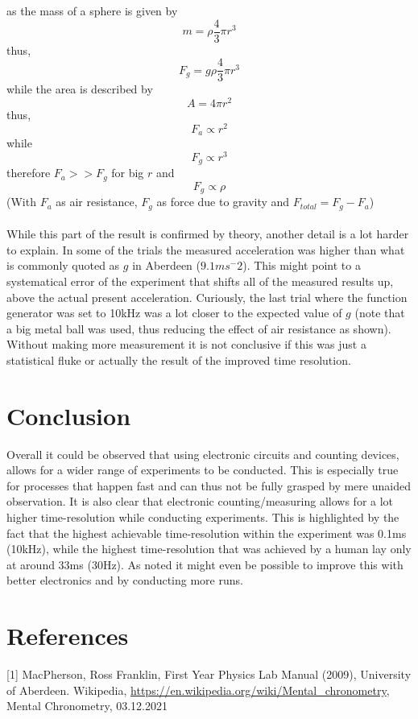 \documentclass[fleqn,14pt]{article}
\begin{document}
as the mass of a sphere is given by
$$
m = \rho \frac{4}{3} \pi r^3
$$
thus,
$$
F_g = g \rho \frac{4}{3} \pi r^3
$$
while the area is described by
$$
A =  4 \pi r^2
$$
thus,
$$
F_a \propto r^2
$$
while
$$
F_g \propto r^3
$$
therefore $F_a >> F_g$ for big $r$
and
$$
F_g \propto \rho
$$
(With $F_a$ as air resistance, $F_g$ as force due to gravity and
$F_{total} = F_g - F_a$)\\
\\
While this part of the result is confirmed by theory, another detail is a lot harder to explain. In some
of the trials the measured acceleration was higher than what is commonly quoted as $g$ in Aberdeen ($9.1ms^-2$).
This might point to a systematical error of the experiment that shifts all of the measured results up, above
the actual present acceleration. Curiously, the last trial where the function generator was set to 10kHz was
a lot closer to the expected value of $g$ (note that a big metal ball was used, thus reducing the effect of 
air resistance as shown). Without making more measurement it is not conclusive if this was just a statistical
fluke or actually the result of the improved time resolution.

\section{Conclusion}
Overall it could be observed that using electronic circuits and counting devices, allows for a wider range
of experiments to be conducted. This is especially true for processes that happen fast and can thus not
be fully grasped by mere unaided observation. It is also clear that electronic counting/measuring allows
for a lot higher time-resolution while conducting experiments. This is highlighted by the fact that the
highest achievable time-resolution within the experiment was 0.1ms (10kHz), while the highest time-resolution
that was achieved by a human lay only at around 33ms (30Hz). As noted it might even be possible to improve
this with better electronics and by conducting more runs.


\section{References}
[1] MacPherson, Ross Franklin, First Year Physics Lab Manual (2009), University of Aberdeen.
\newline
[2] Wikipedia, \url{https://en.wikipedia.org/wiki/Mental_chronometry}, Mental Chronometry, 03.12.2021
\end{document}
